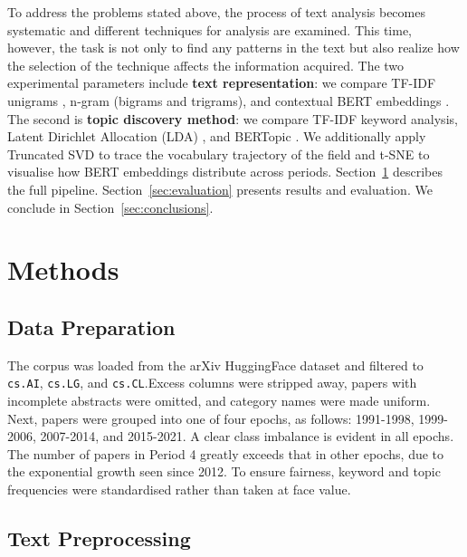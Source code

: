 \documentclass{article}
\begin{document}
To address the problems stated above,
the process of text analysis becomes systematic and
different techniques for analysis are examined. This time,
however, the task is not only to find any patterns in the
text but also realize how the selection of the technique affects
the information acquired. The two experimental parameters include \textbf{text representation}: we compare
TF-IDF unigrams \citep{scikit-learn}, n-gram (bigrams and trigrams), and contextual BERT embeddings
\citep{bge2023}. The second is \textbf{topic discovery
method}: we compare TF-IDF keyword analysis, Latent
Dirichlet Allocation (LDA) \citep{blei2003latent}, and
BERTopic \citep{grootendorst2022bertopic}. We additionally
apply Truncated SVD \citep{scikit-learn} to trace the
vocabulary trajectory of the field and t-SNE
\citep{vandermaaten2008} to visualise how BERT embeddings
distribute across periods.
Section~\ref{sec:methods} describes the full pipeline.
Section~\ref{sec:evaluation} presents results and
evaluation. We conclude in Section~\ref{sec:conclusions}.


\section{Methods}
\label{sec:methods}

\subsection{Data Preparation}

The corpus was loaded from the arXiv HuggingFace dataset
\citep{arxiv2020} and filtered to \texttt{cs.AI},
\texttt{cs.LG}, and \texttt{cs.CL}.Excess columns were stripped away, papers with incomplete
abstracts were omitted, and category names were made uniform.
Next, papers were grouped into one of four epochs, as
follows: 1991-1998, 1999-2006, 2007-2014, and 2015-2021.
A clear class imbalance is evident in all epochs. The
number of papers in Period 4 greatly exceeds that in other
epochs, due to the exponential growth seen since 2012.
To ensure fairness, keyword and topic frequencies were
standardised rather than taken at face value.

\subsection{Text Preprocessing}
\end{document}
